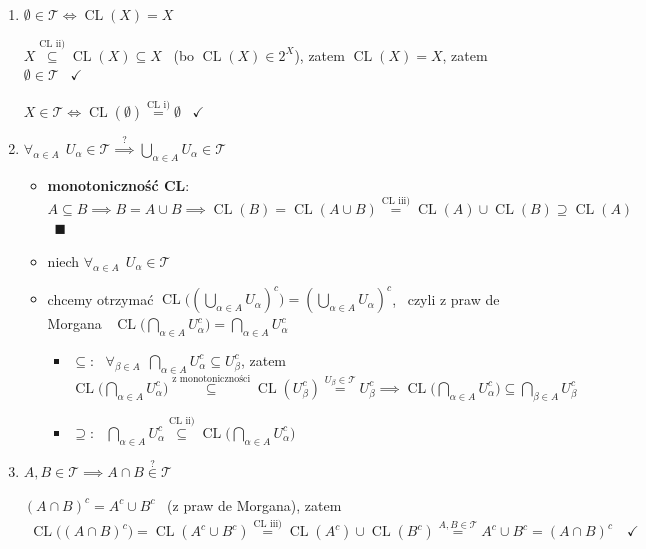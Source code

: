 \documentclass[a4paper,12pt]{article}
\begin{document}
\smallskip
\begin{enumerate}[label=\roman*), leftmargin=1.9em, itemsep=0.2em, topsep=0.2em, parsep=0pt, partopsep=0pt]
    \item \(\emptyset \in \mathcal{T} \iff \operatorname{CL}(X) = X\)

    \(X \overset{\text{CL ii)}}{\subseteq} \operatorname{CL}(X) \subseteq X\) \, (bo \(\operatorname{CL}(X) \in 2^X\)), \; zatem \(\operatorname{CL}(X) = X\), \; zatem \(\emptyset \in \mathcal{T}\) \, \(\checkmark\)

    \(X \in \mathcal{T} \iff \operatorname{CL}(\emptyset) \overset{\text{CL i)}}{=} \emptyset\) \, \(\checkmark\)
    \smallskip
    \item \(\forall_{\alpha \in A} \;\, U_\alpha \in \mathcal{T} \overset{?}{\implies} \bigcup_{\alpha \in A} U_\alpha \in \mathcal{T}\)
    \begin{itemize}
        \item \textbf{monotoniczność CL}: \, \(A \subseteq B \implies B = A \cup B \implies \operatorname{CL}(B) = \operatorname{CL}(A \cup B) \overset{\text{CL iii)}}{=} \operatorname{CL}(A) \cup \operatorname{CL}(B) \supseteq \operatorname{CL}(A)\) \, \(\blacksquare\)
        \item niech \(\forall_{\alpha \in A} \;\, U_\alpha \in \mathcal{T}\)
        \item chcemy otrzymać \(\operatorname{CL}\big((\bigcup_{\alpha \in A} U_\alpha)^c\big) = (\bigcup_{\alpha \in A} U_\alpha)^c\), \, czyli z praw de Morgana \, \(\operatorname{CL}\big(\bigcap_{\alpha \in A} U_\alpha^c\big) = \bigcap_{\alpha \in A} U_\alpha^c\)
        \begin{itemize}
            \item \(\subseteq\): \, \(\forall_{\beta \in A} \;\, \bigcap_{\alpha \in A} U_\alpha^c \subseteq U_\beta^c\), \; zatem \(\operatorname{CL}\big(\bigcap_{\alpha \in A} U_\alpha^c\big) \overset{\text{z monotoniczności}}{\subseteq} \operatorname{CL}(U_\beta^c) \overset{U_\beta \in \mathcal{T}}{=} U_\beta^c \implies \operatorname{CL}\big(\bigcap_{\alpha \in A} U_\alpha^c\big) \subseteq \bigcap_{\beta \in A} U_\beta^c\)
            \item \(\supseteq\): \, \(\bigcap_{\alpha \in A} U_\alpha^c \overset{\text{CL ii)}}{\subseteq} \operatorname{CL}\big(\bigcap_{\alpha \in A} U_\alpha^c\big)\)
        \end{itemize}
    \end{itemize}
    \item \(A, B \in \mathcal{T} \implies A \cap B \overset{?}{\in} \mathcal{T}\)

    \((A \cap B)^c = A^c \cup B^c\) \, (z praw de Morgana), \; zatem
    \begin{align*}
    \operatorname{CL}\big((A \cap B)^c\big) = \operatorname{CL}(A^c \cup B^c) \overset{\text{CL iii)}}{=} \operatorname{CL}(A^c) \cup \operatorname{CL}(B^c) \overset{A, B \in \mathcal{T}}{=} A^c \cup B^c = (A \cap B)^c \quad \checkmark
    \end{align*}
\end{enumerate}
\end{document}
